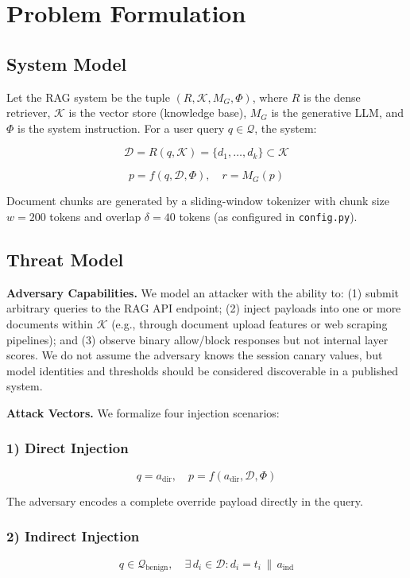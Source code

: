 \documentclass[conference]{IEEEtran}
\begin{document}
\section{Problem Formulation}

\subsection{System Model}

Let the RAG system be the tuple $(R, \mathcal{K}, M_G, \Phi)$, where $R$ is the dense retriever, $\mathcal{K}$ is the vector store (knowledge base), $M_G$ is the generative LLM, and $\Phi$ is the system instruction. For a user query $q \in \mathcal{Q}$, the system:


$$\mathcal{D} = R(q, \mathcal{K}) = \{d_1, \ldots, d_k\} \subset \mathcal{K}$$


$$p = f(q, \mathcal{D}, \Phi), \quad r = M_G(p)$$


Document chunks are generated by a sliding-window tokenizer with chunk size $w = 200$ tokens and overlap $\delta = 40$ tokens (as configured in \texttt{config.py}).


\subsection{Threat Model}

\textbf{Adversary Capabilities.} We model an attacker with the ability to: (1) submit arbitrary queries to the RAG API endpoint; (2) inject payloads into one or more documents within $\mathcal{K}$ (e.g., through document upload features or web scraping pipelines); and (3) observe binary allow/block responses but not internal layer scores. We do not assume the adversary knows the session canary values, but model identities and thresholds should be considered discoverable in a published system.


\textbf{Attack Vectors.} We formalize four injection scenarios:


\subsubsection{1) Direct Injection}
$$q = a_{\text{dir}}, \quad p = f(a_{\text{dir}}, \mathcal{D}, \Phi)$$

The adversary encodes a complete override payload directly in the query.


\subsubsection{2) Indirect Injection}
$$q \in \mathcal{Q}_{\text{benign}}, \quad \exists\, d_i \in \mathcal{D}: d_i = t_i \,\|\, a_{\text{ind}}$$
\end{document}
